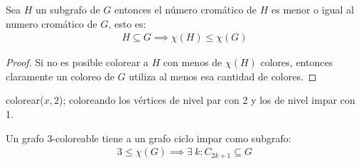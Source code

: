 \begin{lemma}\label{chi_subgrafo}
Sea $H$ un subgrafo de $G$ entonces el número cromático de $H$ es menor o igual al numero cromático de $G$, esto es:
    \begin{align}
        H \subseteq G \implies \chi(H) \le \chi(G)
    \end{align}
\end{lemma}
\begin{proof}
Si no es posible colorear a $H$ con menos de $\chi(H)$ colores, entonces claramente un coloreo de $G$ utiliza al menos esa cantidad de colores.
\end{proof}

\begin{algorithm}
\begin{algorithmic}
    \State colorear($x, 2$);
    \State {} coloreando los vértices de nivel par con 2 y los de nivel impar con 1.
    \EndFor
    \EndFunction
\end{algorithmic}
\end{algorithm}

\begin{lemma}\label{3colores_cicloimpar}
Un grafo $3$-coloreable tiene a un grafo ciclo impar como subgrafo:
\begin{align}
    3 \le \chi(G) \implies \exists~ k\colon C_{2k+1} \subseteq G 
\end{align}
\end{lemma}

